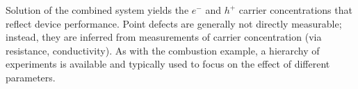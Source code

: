 \documentclass[11pt]{article}
\begin{document}
  Solution of the combined system yields the $e^-$ and
  $h^+$ carrier concentrations that reflect device
  performance. Point defects are generally not directly measurable;
  instead, they are inferred from measurements of carrier
  concentration (via resistance, conductivity). As with the combustion
  example, a hierarchy of experiments is available and typically used
  to focus on the effect of different parameters.


\end{document}
